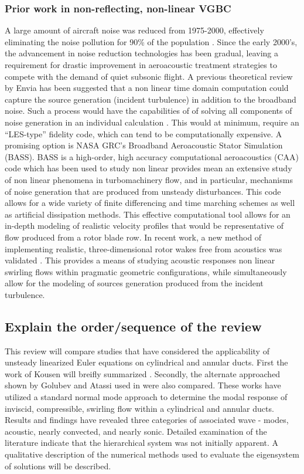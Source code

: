 \subsubsection{Prior work in non-reflecting, non-linear VGBC}
A large amount of aircraft noise was reduced from 1975-2000, 
effectively eliminating the noise pollution for 90\% of the population \cite{Administration}. 
Since the early 2000's, the advancement in noise reduction technologies has been gradual, 
leaving a requirement for drastic improvement in aeroacoustic treatment 
strategies to compete with the demand of quiet subsonic  flight. 
A previous theoretical review by Envia has been suggested that a non linear 
time domain computation could capture the source generation (incident turbulence) 
in addition to the broadband noise. Such a process would have the capabilities 
of  of solving all components of noise generation in an individual calculation \cite{Envia2004}. 
This would at minimum, require an ``LES-type'' fidelity code, which can tend 
to be computationally expensive.  A promising option is NASA GRC's Broadband 
Aeroacoustic Stator Simulation (BASS).  BASS is a high-order, high 
accuracy computational aeroacoustics (CAA) code which has been used to study 
non linear provides mean an extensive study of non linear phenomena in 
turbomachinery flow, and in particular, mechanisms of noise generation that are 
produced from unsteady disturbances. This code allows for a wide variety of 
finite differencing and time marching schemes as well as artificial dissipation methods. This effective computational tool allows for an in-depth modeling of realistic velocity profiles that would be representative of flow produced from a rotor blade row. In recent work, a new method of implementing realistic, three-dimensional rotor wakes free from acoustics was validated  \cite{Hixon2011}. This provides a means of studying acoustic responses non linear swirling flows within pragmatic geometric configurations, while simultaneously allow for the modeling of sources generation produced from the incident turbulence. 

\subsection{Explain the order/sequence of the review}
This review will compare studies that have considered the applicability of unsteady linearized Euler equations on cylindrical and annular ducts. First the work of Kousen will breifly summarized \cite{Kousen1996,Kousen1999}. Secondly, the alternate approached shown by Golubev and Atassi used in \cite{Golubev1996,Golubev1998} were also compared. These works have utilized a standard normal mode approach to determine the modal response of inviscid, compressible, swirling flow within a cylindrical and annular ducts. Results and findings have revealed three categories of associated wave - modes, acoustic, nearly convected, and nearly sonic. Detailed examination of the literature indicate that the hierarchical system was not initially apparent. A qualitative description of the numerical methods used to evaluate the eigensystem of solutions will be described.

